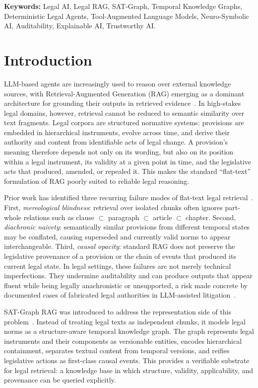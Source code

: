 \documentclass[11pt]{article}
\begin{document}
\noindent\textbf{Keywords:} Legal AI, Legal RAG, SAT-Graph, Temporal Knowledge Graphs, Deterministic Legal Agents, Tool-Augmented Language Models, Neuro-Symbolic AI, Auditability, Explainable AI, Trustworthy AI.

\section{Introduction}
\label{sec:introduction}

LLM-based agents are increasingly used to reason over external knowledge sources, with Retrieval-Augmented Generation (RAG) emerging as a dominant architecture for grounding their outputs in retrieved evidence~\cite{lewis2020retrieval}. In high-stakes legal domains, however, retrieval cannot be reduced to semantic similarity over text fragments. Legal corpora are structured normative systems: provisions are embedded in hierarchical instruments, evolve across time, and derive their authority and content from identifiable acts of legal change. A provision's meaning therefore depends not only on its wording, but also on its position within a legal instrument, its validity at a given point in time, and the legislative acts that produced, amended, or repealed it. This makes the standard ``flat-text'' formulation of RAG poorly suited to reliable legal reasoning.

Prior work has identified three recurring failure modes of flat-text legal retrieval~\cite{demartim2025graphrag}. First, \textit{mereological blindness}: retrieval over isolated chunks often ignores part-whole relations such as clause $\subset$ paragraph $\subset$ article $\subset$ chapter. Second, \textit{diachronic naivety}: semantically similar provisions from different temporal states may be conflated, causing superseded and currently valid norms to appear interchangeable. Third, \textit{causal opacity}: standard RAG does not preserve the legislative provenance of a provision or the chain of events that produced its current legal state. In legal settings, these failures are not merely technical imperfections. They undermine auditability and can produce outputs that appear fluent while being legally anachronistic or unsupported, a risk made concrete by documented cases of fabricated legal authorities in LLM-assisted litigation~\cite{mata2023avianca,dahl2024largelegalfictions}.

SAT-Graph RAG was introduced to address the representation side of this problem~\cite{demartim2025graphrag}. Instead of treating legal texts as independent chunks, it models legal norms as a structure-aware temporal knowledge graph. The graph represents legal instruments and their components as versionable entities, encodes hierarchical containment, separates textual content from temporal versions, and reifies legislative actions as first-class causal events. This provides a verifiable substrate for legal retrieval: a knowledge base in which structure, validity, applicability, and provenance can be queried explicitly.
\end{document}
